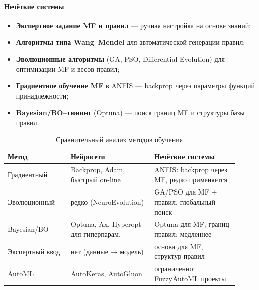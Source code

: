 \paragraph{Нечёткие системы}
\begin{itemize}
  \item \textbf{Экспертное задание MF и правил} — ручная настройка на основе знаний;
  \item \textbf{Алгоритмы типа Wang–Mendel} \cite{Wang1992} для автоматической генерации правил;
  \item \textbf{Эволюционные алгоритмы} (GA, PSO, Differential Evolution) для оптимизации MF и весов правил;
  \item \textbf{Градиентное обучение MF} в ANFIS — backprop через параметры функций принадлежности;
  \item \textbf{Bayesian/BO–тюнинг} (Optuna) — поиск границ MF и структуры базы правил.
\end{itemize}

\begin{table}[H]
\centering\small
\caption{Сравнительный анализ методов обучения}
\begin{tabular}{@{}p{0.25\linewidth}p{0.33\linewidth}p{0.33\linewidth}@{}}
\toprule
\textbf{Метод} & \textbf{Нейросети} & \textbf{Нечёткие системы} \\ \midrule
Градиентный & 
Backprop, Adam, быстрый on-line & 
ANFIS: backprop через MF, редко применяется  \\[2pt]
Эволюционный & 
редко (NeuroEvolution) &
GA/PSO для MF + правил, глобальный поиск \\[2pt]
Bayesian/BO & 
Optuna, Ax, Hyperopt для гиперпарам. &
Optuna для MF, границ правил; медленнее \\[2pt]
Экспертный ввод & 
нет (данные → модель) &
основа для MF, структур правил \\[2pt]
AutoML & 
AutoKeras, AutoGluon &
ограниченно: FuzzyAutoML проекты \\ 
\bottomrule
\end{tabular}
\end{table}

